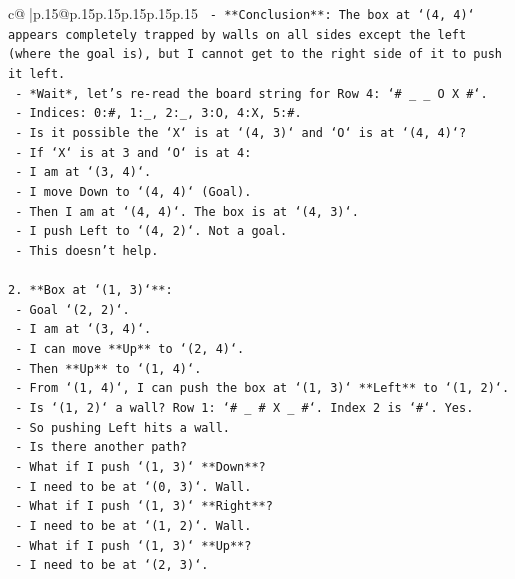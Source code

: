 \documentclass{article}
\begin{document}
{\begin{supertabular}{c@{$\;$}|p{.15\linewidth}@{}p{.15\linewidth}p{.15\linewidth}p{.15\linewidth}p{.15\linewidth}p{.15\linewidth}}
{{{\texttt{    {-}   **Conclusion**: The box at `(4, 4)` appears completely trapped by walls on all sides except the left (where the goal is), but I cannot get to the right side of it to push it left.} \\
\texttt{    {-}   *Wait*, let's re{-}read the board string for Row 4: `\# \_ \_ O X \#`.} \\
\texttt{        {-}   Indices: 0:\#, 1:\_, 2:\_, 3:O, 4:X, 5:\#.} \\
\texttt{        {-}   Is it possible the `X` is at `(4, 3)` and `O` is at `(4, 4)`?} \\
\texttt{        {-}   If `X` is at 3 and `O` is at 4:} \\
\texttt{            {-}   I am at `(3, 4)`.} \\
\texttt{            {-}   I move Down to `(4, 4)` (Goal).} \\
\texttt{            {-}   Then I am at `(4, 4)`. The box is at `(4, 3)`.} \\
\texttt{            {-}   I push Left to `(4, 2)`. Not a goal.} \\
\texttt{        {-}   This doesn't help.} \\
\\ 
\texttt{2.  **Box at `(1, 3)`**:} \\
\texttt{    {-}   Goal `(2, 2)`.} \\
\texttt{    {-}   I am at `(3, 4)`.} \\
\texttt{    {-}   I can move **Up** to `(2, 4)`.} \\
\texttt{    {-}   Then **Up** to `(1, 4)`.} \\
\texttt{    {-}   From `(1, 4)`, I can push the box at `(1, 3)` **Left** to `(1, 2)`.} \\
\texttt{    {-}   Is `(1, 2)` a wall? Row 1: `\# \_ \# X \_ \#`. Index 2 is `\#`. Yes.} \\
\texttt{    {-}   So pushing Left hits a wall.} \\
\texttt{    {-}   Is there another path?} \\
\texttt{    {-}   What if I push `(1, 3)` **Down**?} \\
\texttt{        {-}   I need to be at `(0, 3)`. Wall.} \\
\texttt{    {-}   What if I push `(1, 3)` **Right**?} \\
\texttt{        {-}   I need to be at `(1, 2)`. Wall.} \\
\texttt{    {-}   What if I push `(1, 3)` **Up**?} \\
\texttt{        {-}   I need to be at `(2, 3)`.} \\
}}}
\end{supertabular}}
\end{document}
